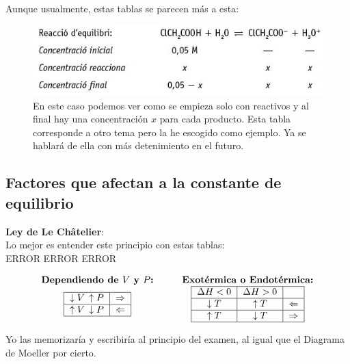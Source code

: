 \documentclass[arial,a4paper,print]{article}
\begin{document}
Aunque usualmente, estas tablas se parecen más a esta:
\begin{figure}[H]
	\centering
	\includegraphics[width=0.7\linewidth]{figures/tabla2_Kc}
	\caption{En este caso podemos ver como se empieza solo con reactivos y al final hay una concentración $x$ para cada producto. Esta tabla corresponde a otro tema pero la he escogido como ejemplo. Ya se hablará de ella con más detenimiento en el futuro. }
	\label{fig:tabla2kc}
\end{figure}

\subsection{Factores que afectan a la constante de equilibrio}

\textbf{Ley de Le Châtelier}: \\
Lo mejor es entender este principio con estas tablas: \\
ERROR ERROR ERROR

\begin{equation*}
	\begin{array}{cc}
		\textbf{Dependiendo de $V$ y $P$:} \qquad &	\textbf{Exotérmica o Endotérmica:} \\	
		
		
	\begin{tabular}{|c|c|}
		\hline
		$\downarrow V\, \uparrow P$  & $\Rightarrow$ \\
		\hline
		$\uparrow V\, \downarrow P$ & $\Leftarrow$ \\
		\hline
	\end{tabular}

	\qquad &
	
	\begin{tabular}{|c|c|c|} 
		\hline
		$\Delta H <0$ & $\Delta H > 0$  &  \\
		\hline
		$\downarrow T$  & $\uparrow T$ & $\Leftarrow$ \\
		\hline
		$\uparrow T$ & $\downarrow T$ & $\Rightarrow$ \\
		\hline
	\end{tabular}
\end{array}
\end{equation*}

Yo las memorizaría y escribiría al principio del examen, al igual que el Diagrama de Moeller por cierto. 
\end{document}
